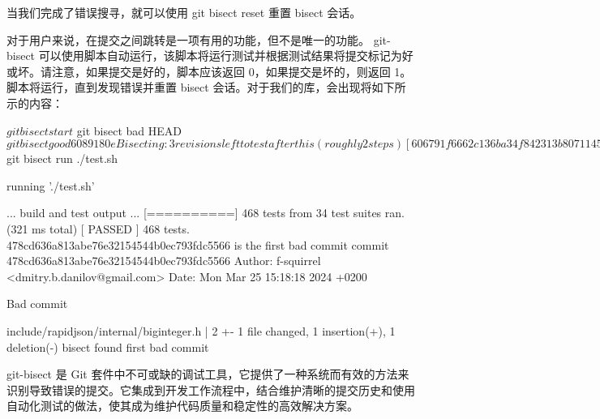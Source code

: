 当我们完成了错误搜寻，就可以使用 git bisect reset 重置 bisect 会话。

对于用户来说，在提交之间跳转是一项有用的功能，但不是唯一的功能。 git-bisect 可以使用脚本自动运行，该脚本将运行测试并根据测试结果将提交标记为好或坏。请注意，如果提交是好的，脚本应该返回 0，如果提交是坏的，则返回 1。脚本将运行，直到发现错误并重置 bisect 会话。对于我们的库，会出现将如下所示的内容：

\begin{shell}
$ git bisect start
$ git bisect bad HEAD
$ git bisect good 6089180e

Bisecting: 3 revisions left to test after this (roughly 2 steps)
[606791f6662c136ba34f842313b807114580852d] Fix static_cast in regex.h

$ git bisect run ./test.sh

running './test.sh'

... build and test output ...
[==========] 468 tests from 34 test suites ran. (321 ms total)
[ PASSED ] 468 tests.
478cd636a813abe76e32154544b0ec793fdc5566 is the first bad commit
commit 478cd636a813abe76e32154544b0ec793fdc5566
Author: f-squirrel <dmitry.b.danilov@gmail.com>
Date: Mon Mar 25 15:18:18 2024 +0200

    Bad commit

 include/rapidjson/internal/biginteger.h | 2 +-
 1 file changed, 1 insertion(+), 1 deletion(-)
bisect found first bad commit
\end{shell}

git-bisect 是 Git 套件中不可或缺的调试工具，它提供了一种系统而有效的方法来识别导致错误的提交。它集成到开发工作流程中，结合维护清晰的提交历史和使用自动化测试的做法，使其成为维护代码质量和稳定性的高效解决方案。





















